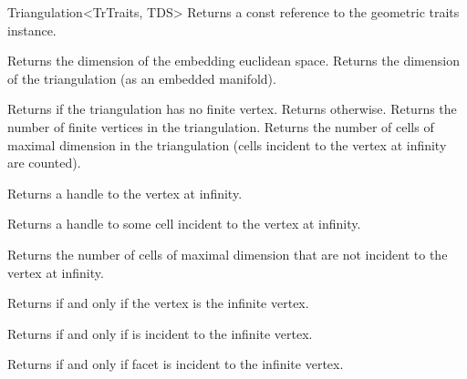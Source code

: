 \begin{ccRefClass}{Triangulation<TrTraits, TDS>}
%
{Returns a const reference to the geometric traits instance.}

%
{Returns the dimension of the embedding euclidean space.}
\ccGlue
{}%
{Returns the dimension of the triangulation (as an embedded manifold).}

%
{Returns  if the triangulation has no finite vertex. Returns
 otherwise.}
\ccGlue
{}%
{Returns the number of finite vertices in the triangulation.}
\ccGlue
{}%
{Returns the number of cells of maximal dimension in the triangulation
(cells incident to the vertex at infinity are counted).}

%
{Returns a handle to the vertex at infinity.}

%
{Returns a handle to some cell incident to the vertex at infinity.}


%
{Returns the number of cells of maximal dimension that are not
  incident to the vertex at infinity.}




{Returns  if and only if the vertex  is the infinite vertex.}

\ccGlue

{Returns  if and only if  is incident to the infinite vertex.
}

\ccGlue

{Returns  if and only if facet  is incident to the infinite
vertex. 
}

\ccGlue



\end{ccRefClass}
